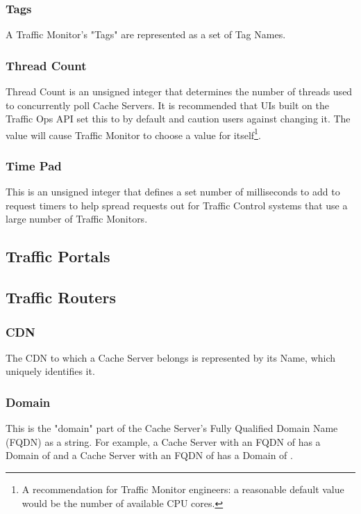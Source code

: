 \subsubsection{Tags}
A Traffic Monitor's "Tags" are represented as a set of Tag Names.

\subsubsection{Thread Count}
Thread Count is an unsigned integer that determines the number of threads used
to concurrently poll Cache Servers. It is recommended that UIs built on the
Traffic Ops API set this to  by default and caution users against
changing it. The value  will cause Traffic Monitor to choose a value
for itself\footnote{A recommendation for Traffic Monitor engineers: a
reasonable default value would be the number of available CPU cores.}.

\subsubsection{Time Pad}
This is an unsigned integer that defines a set number of milliseconds to add
to request timers to help spread requests out for Traffic Control systems that
use a large number of Traffic Monitors.

\subsection{Traffic Portals}



\subsection{Traffic Routers}

\subsubsection{CDN}
The CDN to which a Cache Server belongs is represented by its Name, which
uniquely identifies it.

\subsubsection{Domain}
This is the "domain" part of the Cache Server's Fully Qualified Domain Name
(FQDN) as a string. For example, a Cache Server with an FQDN of
 has a Domain of  and a Cache Server with an FQDN of
 has a Domain of .

